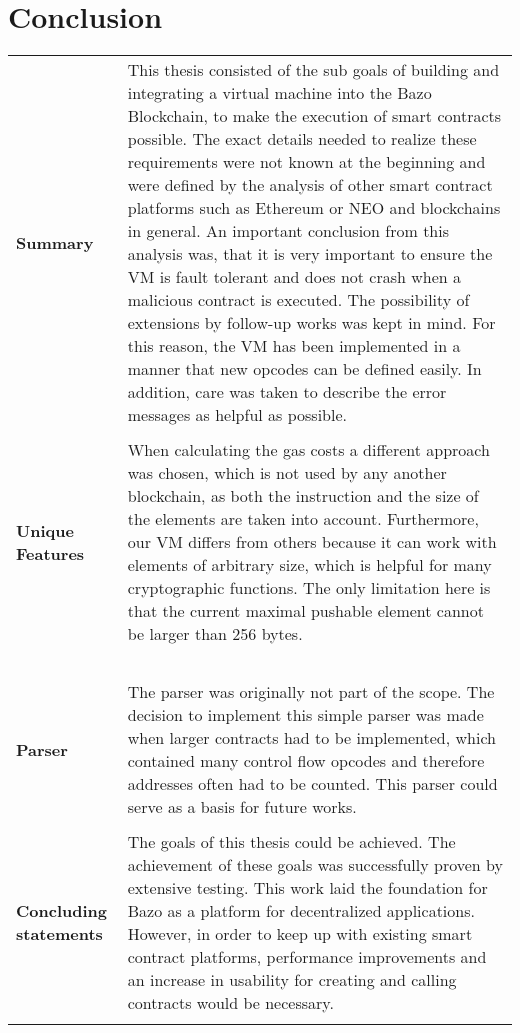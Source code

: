 \chapter{Conclusion}
\label{futureworkandconclusions}

\begin{tabular}[t]{ p{3cm} p{12.5cm}}
\raggedright
\textbf{Summary} & 
This thesis consisted of the sub goals of building and integrating a virtual machine into the Bazo Blockchain, to make the execution of smart contracts possible. The exact details needed to realize these requirements were not known at the beginning and were defined by the analysis of other smart contract platforms such as Ethereum or NEO and blockchains in general. An important conclusion from this analysis was, that it is very important to ensure the VM is fault tolerant and does not crash when a malicious contract is executed. The possibility of extensions by follow-up works was kept in mind. For this reason, the VM has been implemented in a manner that new opcodes can be defined easily. In addition, care was taken to describe the error messages as helpful as possible. \\ \\

\raggedright
\textbf{Unique Features} & 
When calculating the gas costs a different approach was chosen, which is not used by any another blockchain, as both the instruction and the size of the elements are taken into account. Furthermore, our VM differs from others because it can work with elements of arbitrary size, which is helpful for many cryptographic functions. The only limitation here is that the current maximal pushable element cannot be larger than 256 bytes. \\ \\

\raggedright
\textbf{Parser} &
The parser was originally not part of the scope. The decision to implement this simple parser was made when larger contracts had to be implemented, which contained many control flow opcodes and therefore addresses often had to be counted. This parser could serve as a basis for future works. \\ \\

\raggedright
\textbf{Concluding statements } &
The goals of this thesis could be achieved. The achievement of these goals was successfully proven by extensive testing. This work laid the foundation for Bazo as a platform for decentralized applications. However, in order to keep up with existing smart contract platforms, performance improvements and an increase in usability for creating and calling contracts would be necessary. \\ \\
\end{tabular}

